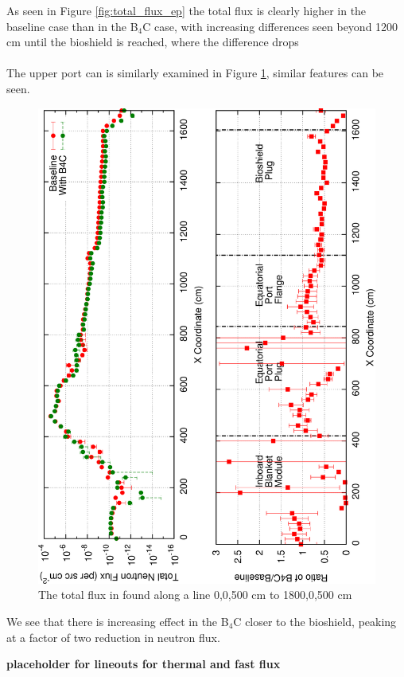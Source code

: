 \documentclass[12pt]{article}
\begin{document}
As seen in Figure \ref{fig:total_flux_ep} the total flux is clearly higher in 
the baseline case than in the B$_4$C case, with increasing differences seen
beyond 1200 cm until the bioshield is reached, where the difference drops
\\
\\
The upper port can is similarly examined in Figure \ref{fig:total_flux_up},
similar features can be seen.
\begin{figure}[ht!]
  \centering
  \includegraphics[angle=-90,clip,scale=0.15]{../plots/neutron/total_flux_up.png}     
  \caption{The total flux in found along a line 0,0,500 cm to 1800,0,500 cm}
  \label{fig:total_flux_up}
\end{figure}
We see that there is increasing effect in the B$_4$C closer to the bioshield, peaking
at a factor of two reduction in neutron flux.

\textbf{placeholder for lineouts for thermal and fast flux}
\end{document}
